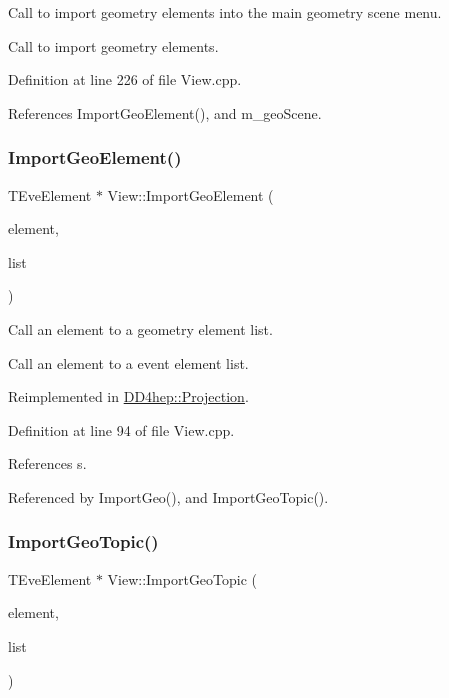 Call to import geometry elements into the main geometry scene menu. 

Call to import geometry elements. 

Definition at line 226 of file View.\+cpp.



References Import\+Geo\+Element(), and m\+\_\+geo\+Scene.

\hypertarget{class_d_d4hep_1_1_view_adc25ba7ece97c2f7c69f8fa6e0c13088}{}\label{class_d_d4hep_1_1_view_adc25ba7ece97c2f7c69f8fa6e0c13088} 
\subsubsection{\texorpdfstring{Import\+Geo\+Element()}{ImportGeoElement()}}
{\footnotesize\ttfamily T\+Eve\+Element $\ast$ View\+::\+Import\+Geo\+Element (\begin{DoxyParamCaption}\item[{T\+Eve\+Element $\ast$}]{element,  }\item[{\hyperlink{class_t_eve_element_list}{T\+Eve\+Element\+List} $\ast$}]{list }\end{DoxyParamCaption})\hspace{0.3cm}{\ttfamily [virtual]}}



Call an element to a geometry element list. 

Call an element to a event element list. 

Reimplemented in \hyperlink{class_d_d4hep_1_1_projection_a05c32084a42c00a366077acec5a55a82}{D\+D4hep\+::\+Projection}.



Definition at line 94 of file View.\+cpp.



References s.



Referenced by Import\+Geo(), and Import\+Geo\+Topic().

\hypertarget{class_d_d4hep_1_1_view_a413a1148e0fb6d3007c971e9f1266629}{}\label{class_d_d4hep_1_1_view_a413a1148e0fb6d3007c971e9f1266629} 
\subsubsection{\texorpdfstring{Import\+Geo\+Topic()}{ImportGeoTopic()}}
{\footnotesize\ttfamily T\+Eve\+Element $\ast$ View\+::\+Import\+Geo\+Topic (\begin{DoxyParamCaption}\item[{T\+Eve\+Element $\ast$}]{element,  }\item[{\hyperlink{class_t_eve_element_list}{T\+Eve\+Element\+List} $\ast$}]{list }\end{DoxyParamCaption})\hspace{0.3cm}{\ttfamily [virtual]}}



